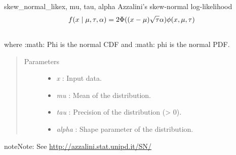 \hypertarget{pymc.distributions.skew_normal_like}{}\begin{funcdesc}{skew\_normal\_like}{x, mu, tau, alpha}
Azzalini's skew-normal log-likelihood
\begin{gather}
\begin{split}f(x \mid \mu, \tau, \alpha) = 2 \Phi((x-\mu)\sqrt{\tau}\alpha) \phi(x,\mu,\tau)\end{split}\notag\\\begin{split}\end{split}\notag
\end{gather}
where :math: Phi is the normal CDF and :math: phi is the normal PDF.
\begin{quote}\begin{description}
\item[Parameters] \leavevmode\begin{itemize}
\item {} 
\emph{x} : Input data.

\item {} 
\emph{mu} : Mean of the distribution.

\item {} 
\emph{tau} : Precision of the distribution (\textgreater{} 0).

\item {} 
\emph{alpha} : Shape parameter of the distribution.

\end{itemize}

\end{description}\end{quote}

\begin{notice}{note}{Note:}
See \href{http://azzalini.stat.unipd.it/SN/}{http://azzalini.stat.unipd.it/SN/}
\end{notice}
\end{funcdesc}

